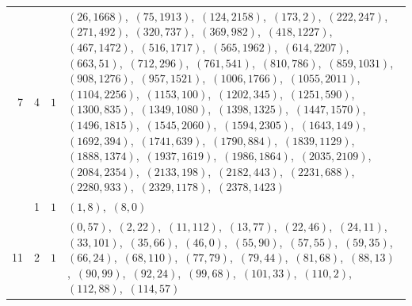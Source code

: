\documentclass[11pt]{article}
\begin{document}
\begin{longtable}{@{}rrl>{\raggedright\arraybackslash}p{}@{}}
7 & 4 & $1$ & $(26,1668)$,\allowbreak\ $(75,1913)$,\allowbreak\ $(124,2158)$,\allowbreak\ $(173,2)$,\allowbreak\ $(222,247)$,\allowbreak\ $(271,492)$,\allowbreak\ $(320,737)$,\allowbreak\ $(369,982)$,\allowbreak\ $(418,1227)$,\allowbreak\ $(467,1472)$,\allowbreak\ $(516,1717)$,\allowbreak\ $(565,1962)$,\allowbreak\ $(614,2207)$,\allowbreak\ $(663,51)$,\allowbreak\ $(712,296)$,\allowbreak\ $(761,541)$,\allowbreak\ $(810,786)$,\allowbreak\ $(859,1031)$,\allowbreak\ $(908,1276)$,\allowbreak\ $(957,1521)$,\allowbreak\ $(1006,1766)$,\allowbreak\ $(1055,2011)$,\allowbreak\ $(1104,2256)$,\allowbreak\ $(1153,100)$,\allowbreak\ $(1202,345)$,\allowbreak\ $(1251,590)$,\allowbreak\ $(1300,835)$,\allowbreak\ $(1349,1080)$,\allowbreak\ $(1398,1325)$,\allowbreak\ $(1447,1570)$,\allowbreak\ $(1496,1815)$,\allowbreak\ $(1545,2060)$,\allowbreak\ $(1594,2305)$,\allowbreak\ $(1643,149)$,\allowbreak\ $(1692,394)$,\allowbreak\ $(1741,639)$,\allowbreak\ $(1790,884)$,\allowbreak\ $(1839,1129)$,\allowbreak\ $(1888,1374)$,\allowbreak\ $(1937,1619)$,\allowbreak\ $(1986,1864)$,\allowbreak\ $(2035,2109)$,\allowbreak\ $(2084,2354)$,\allowbreak\ $(2133,198)$,\allowbreak\ $(2182,443)$,\allowbreak\ $(2231,688)$,\allowbreak\ $(2280,933)$,\allowbreak\ $(2329,1178)$,\allowbreak\ $(2378,1423)$\\
\addlinespace[3pt]
11 & 1 & $1$ & $(1,8)$,\allowbreak\ $(8,0)$\\
11 & 2 & $1$ & $(0,57)$,\allowbreak\ $(2,22)$,\allowbreak\ $(11,112)$,\allowbreak\ $(13,77)$,\allowbreak\ $(22,46)$,\allowbreak\ $(24,11)$,\allowbreak\ $(33,101)$,\allowbreak\ $(35,66)$,\allowbreak\ $(46,0)$,\allowbreak\ $(55,90)$,\allowbreak\ $(57,55)$,\allowbreak\ $(59,35)$,\allowbreak\ $(66,24)$,\allowbreak\ $(68,110)$,\allowbreak\ $(77,79)$,\allowbreak\ $(79,44)$,\allowbreak\ $(81,68)$,\allowbreak\ $(88,13)$,\allowbreak\ $(90,99)$,\allowbreak\ $(92,24)$,\allowbreak\ $(99,68)$,\allowbreak\ $(101,33)$,\allowbreak\ $(110,2)$,\allowbreak\ $(112,88)$,\allowbreak\ $(114,57)$\\

\end{longtable}
\end{document}
